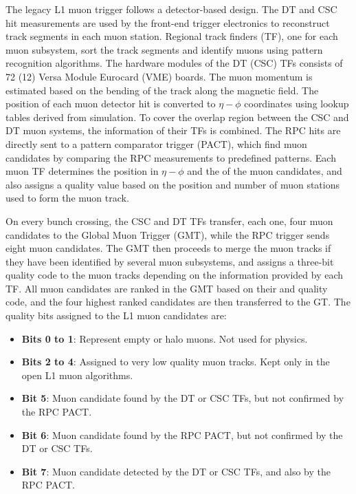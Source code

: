 The legacy L1 muon trigger follows a detector-based design. The DT and CSC hit measurements are used by the front-end trigger electronics to reconstruct track segments in each muon station. Regional track finders (TF), one for each muon subsystem, sort the track segments and identify muons using pattern recognition algorithms. The hardware modules of the DT (CSC) TFs consists of 72 (12) Versa Module
Eurocard (VME) boards. The muon momentum is estimated based on the bending of the track along the magnetic field. The position of each muon detector hit is converted to $\eta-\phi$ coordinates using lookup tables derived from simulation. To cover the overlap region between the CSC and DT muon systems, the information of their TFs is combined. The RPC hits are directly sent to a pattern comparator trigger (PACT), which find muon candidates by comparing the RPC measurements to predefined patterns. Each muon TF determines the position in $\eta-\phi$ and the \pt of the muon candidates, and also assigns a quality value based on the position and number of muon stations used to form the muon track.

On every bunch crossing, the CSC and DT TFs transfer, each one, four muon candidates to the Global Muon Trigger (GMT), while the RPC trigger sends eight muon candidates. The GMT then proceeds to merge the muon tracks if they have been identified by several muon subsystems, and assigns a three-bit quality code to the muon tracks depending on the information provided by each TF. All muon candidates are ranked in the GMT based on their \pt and quality code, and the four highest ranked candidates are then transferred to the GT. The quality bits assigned to the L1 muon candidates are: \begin{itemize}
  \setlength{\itemsep}{0pt}
  \setlength{\parskip}{0pt}
  \setlength{\parsep}{0pt}
  \item \textbf{Bits 0 to 1}: Represent empty or halo muons. Not used for physics.
  \item \textbf{Bits 2 to 4}: Assigned to very low quality muon tracks. Kept only in the open L1 muon algorithms.
  \item \textbf{Bit 5}: Muon candidate found by the DT or CSC TFs, but not confirmed by the RPC PACT.
  \item \textbf{Bit 6}: Muon candidate found by the RPC PACT, but not confirmed by the DT or CSC TFs.
  \item \textbf{Bit 7}: Muon candidate detected by the DT or CSC TFs, and also by the RPC PACT.
\end{itemize}

